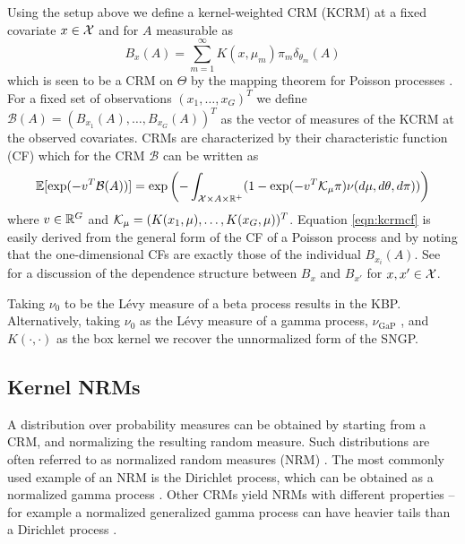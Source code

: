 Using the setup above we define a kernel-weighted CRM (KCRM) at a fixed
covariate $x \in \mathcal{X}$ and for $A$ measurable as
\begin{equation}
\textstyle  B_x(A) = \sum_{m=1}^\infty K(x,\mu_m)\pi_m \delta_{\theta_m}(A)
  \label{eqn:kcrm}
\end{equation}
which is seen to be a CRM on $\Theta$ by the mapping theorem for Poisson
processes \cite{Kingman:1993}.  For a fixed set of observations $(x_1,\ldots,x_G)^T$
we define $\mathcal{B}(A) = (B_{x_1}(A),\ldots,B_{x_G}(A))^T$ as the vector of
measures of the KCRM at the observed covariates.
CRMs are characterized by their
characteristic function (CF) \cite{FristedtGray:1997} which for the 
CRM $\mathcal{B}$ can be written as
\begin{equation}
  \mathbb{E}[\exp(-v^T\mathcal{B}(A))] = \exp \left ( -\int_{\mathcal{X} \times A \times \mathbb{R}^+}
  (1-\exp(-v^T\mathcal{K}_\mu\pi)\nu(d\mu,d\theta,d\pi))\right )
  \label{eqn:kcrmcf}
\end{equation}
where $v \in \mathbb{R}^G$ and $\mathcal{K}_\mu = (K(x_1,\mu),\ldots,K(x_G,\mu))^T$.
Equation \ref{eqn:kcrmcf} is easily derived from the general form of the CF of
a Poisson process \cite{Kingman:1993} and by noting that the one-dimensional CFs are 
exactly those of the individual $B_{x_i}(A)$.  
See \cite{Ren:Wang:Dunson:Carin:2011} for a discussion of the dependence structure
between $B_x$ and $B_{x'}$ for $x,x' \in \mathcal{X}$.

Taking $\nu_0$ to be the L\'evy measure of a beta process \cite{Hjort:1990} results
in the KBP.  Alternatively, taking $\nu_0$ as the L\'evy measure of a
gamma process, $\nu_{\text{GaP}}$ \cite{Ferguson:1973}, and $K(\cdot,\cdot)$ as the
box kernel we recover the unnormalized form of the SNGP.

\subsection{Kernel NRMs}
\label{sec:dNRM} 

A distribution over probability measures can be obtained by starting from a
CRM, and normalizing the resulting random measure.
Such distributions are often referred to as normalized random measures (NRM)
\cite{Regazzini:Lijoi:Prunster:2003}. The most commonly used example of an NRM is the Dirichlet
process, which can be obtained as a normalized gamma process
\cite{Ferguson:1973}.  Other CRMs yield NRMs with different properties -- for
example a normalized generalized gamma process can have heavier tails than a Dirichlet
process \cite{LijoiMenaPrunster:2007}.

